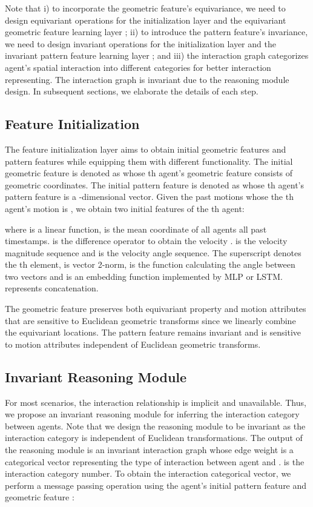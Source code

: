 \documentclass[10pt,twocolumn,letterpaper]{article}
\begin{document}
Note that i) to incorporate the geometric feature's equivariance, we need to design equivariant operations for the initialization layer  and the equivariant 
geometric feature learning layer ; ii) to introduce the pattern feature's invariance, we need to design invariant operations for the initialization layer  and the invariant  
pattern feature learning layer ; and iii) the interaction graph categorizes agent's spatial interaction into different categories for better interaction representing. The interaction graph is invariant  due to the reasoning module  design. 
In subsequent sections, we elaborate the details of each step.


\subsection{Feature Initialization}
\label{sec:init}
\vspace{-1mm}
The feature initialization layer aims to obtain initial geometric features and pattern features while equipping them with different functionality. 
The initial geometric feature is denoted as  whose th agent's geometric feature consists of  geometric coordinates. The initial pattern feature is denoted as 
 whose th agent's pattern feature is a -dimensional vector. Given the past motions  whose the th agent's motion is , we obtain two initial features of the th agent: 

where  is a linear function,  is the mean coordinate of all agents all past timestamps.  is the difference operator to obtain the velocity .
 is the velocity magnitude sequence and  is the velocity angle sequence. The superscript  denotes the th element,  is vector 2-norm,  is the function calculating the angle between two vectors and  is an embedding function implemented by MLP or LSTM. 
 represents concatenation. 


The geometric feature preserves both equivariant property and motion attributes that are sensitive to Euclidean geometric transforms since we linearly combine the equivariant locations. 
The pattern feature remains invariant and is sensitive to motion attributes independent of Euclidean geometric transforms.
  

\subsection{Invariant Reasoning Module}
\vspace{-1mm}
\label{sec:reason}
For most scenarios, the interaction relationship is implicit and unavailable. 
Thus, we propose an invariant reasoning module for inferring the interaction category between agents. Note that we design the reasoning module to be invariant as the interaction category is independent of Euclidean transformations. The output of the reasoning module is an invariant interaction graph whose edge weight  is a categorical vector representing the type of interaction between agent  and .  is the interaction category number. To obtain the interaction categorical vector, we perform a message passing operation using the agent's initial pattern feature  and geometric feature :
\end{document}
